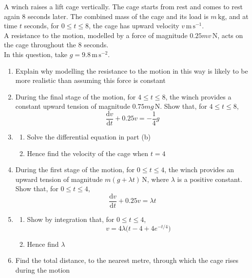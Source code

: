 \documentclass[leqno]{article}
\begin{document}
\begin{enumerate}[
  label=\textbf{\arabic*.},
  leftmargin=*,
  topsep=0pt,
  partopsep=0pt,
  parsep=0pt
]
A winch raises a lift cage vertically. The cage starts from rest and comes to rest again $8$ seconds later. The combined mass of the cage and its load is $m\,\mathrm{kg}$, and at time $t$ seconds, for $0\le t\le 8$, the cage has upward velocity $v\,\mathrm{m\,s^{-1}}$. \\
A resistance to the motion, modelled by a force of magnitude $0.25mv\,\mathrm{N}$, acts on the cage throughout the $8$ seconds. \\
In this question, take $g = 9.8\,\mathrm{m\,s^{-2}}$. \\
\begin{enumerate}[label=\textbf{(\alph*)}]
  \item Explain why modelling the resistance to the motion in this way is likely to be more realistic than assuming this force is constant  \\
  \item During the final stage of the motion, for $4\le t\le 8$, the winch provides a constant upward tension of magnitude $0.75mg\,\mathrm{N}$. Show that, for $4\le t\le 8$,
  \[
  \frac{\mathrm{d}v}{\mathrm{d}t}+0.25v=-\frac{1}{4}g
  \] 
  \item 
  \begin{enumerate}[label=(\roman*)]
    \item Solve the differential equation in part (b) 
    \item Hence find the velocity of the cage when $t=4$  \\
  \end{enumerate}
  \item During the first stage of the motion, for $0\le t\le 4$, the winch provides an upward tension of magnitude $m(g+\lambda t)\,\mathrm{N}$, where $\lambda$ is a positive constant. Show that, for $0\le t\le 4$,
  \[
  \frac{\mathrm{d}v}{\mathrm{d}t}+0.25v=\lambda t
  \] 
  \item 
  \begin{enumerate}[label=(\roman*)]
    \item Show by integration that, for $0\le t\le 4$,
    \[
    v=4\lambda\bigl(t-4+4e^{-t/4}\bigr)
    \] 
    \item Hence find $\lambda$  \\
  \end{enumerate}
  \item Find the total distance, to the nearest metre, through which the cage rises during the motion  \\
\end{enumerate}


\end{enumerate}
\end{document}
